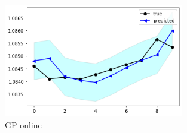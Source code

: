 \documentclass[12pt]{article}
\begin{document}
\begin{figure}[H]
\centering 
\includegraphics[width=0.7\textwidth]{fig/section4/GPonline.png}
\centering 
\caption{GP online}
\end{figure}


\pagebreak
\printbibliography

\newpage
\begin{appendices}


\end{appendices}
\end{document}
